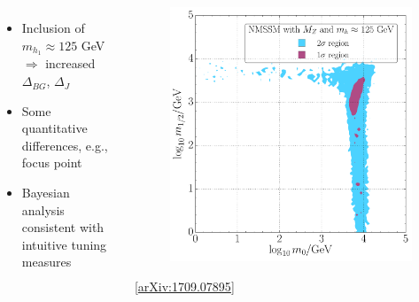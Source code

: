 \documentclass[10pt,aspectratio=169]{beamer}
\begin{document}
\begin{frame}
\begin{columns}[t]
\begin{column}{0.6\textwidth}
\begin{columns}[t]
\begin{column}{0.5\textwidth}
\begin{figure}
          \end{figure}
        \end{column}
      \end{columns}
      \vspace{10pt}
      \begin{minipage}[t][5cm][t]{\textwidth}
      \begin{itemize} \itemsep1em
        \item Inclusion of $m_{h_1} \approx 125$ GeV $\Rightarrow$
          increased $\Delta_{BG}$, $\Delta_J$
        \item Some quantitative differences, e.g., focus point
        \item Bayesian analysis consistent with intuitive tuning measures
      \end{itemize}
    \end{minipage}
    \end{column}
    \begin{column}{0.35\textwidth}
      \begin{figure}
        \centering
        \includegraphics[width=\textwidth]{CNMSSM_pdf_mz_mh_m0m12}
      \end{figure}
      \vspace*{-20pt}
      \begin{center}
        {\tiny [\href{https://arxiv.org/abs/1709.07895}{arXiv:1709.07895}]}
      \end{center}
    \end{column}
  \end{columns}
\end{frame}
\end{document}
